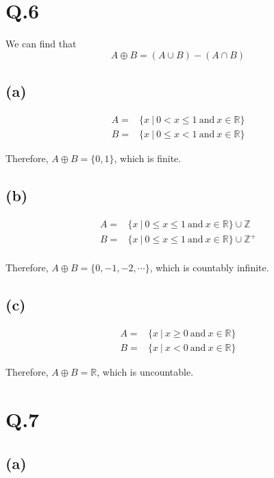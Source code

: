 \documentclass[a4paper,12pt]{article}
\begin{document}
\section*{Q.6}
We can find that
\begin{equation*}
	A \oplus B = (A \cup B) - (A \cap B)
\end{equation*}

\subsection*{(a)}
\begin{align*}
	A =& \{x\ |\ 0 < x \le 1 \  \text{and}\ x \in \mathbb{R}\}\\
	B =& \{x\ |\ 0 \le x < 1 \  \text{and}\ x \in \mathbb{R}\}
\end{align*}

Therefore, $A \oplus B = \{0, 1\}$, which is finite.

\subsection*{(b)}
\begin{align*}
	A =& \{x\ |\ 0 \le x \le 1 \  \text{and}\ x \in \mathbb{R}\} \cup \mathbb{Z}\\
	B =& \{x\ |\ 0 \le x \le 1 \  \text{and}\ x \in \mathbb{R}\} \cup \mathbb{Z}^+\\
\end{align*}

Therefore, $A \oplus B = \{0,-1,-2,\cdots\}$, which is countably infinite.

\subsection*{(c)}
\begin{align*}
	A =& \{x\ |\ x \ge 0 \  \text{and}\ x \in \mathbb{R}\}\\
	B =& \{x\ |\ x < 0 \  \text{and}\ x \in \mathbb{R}\}
\end{align*}

Therefore, $A \oplus B = \mathbb{R}$, which is uncountable.

\section*{Q.7}

\subsection*{(a)}
\end{document}
